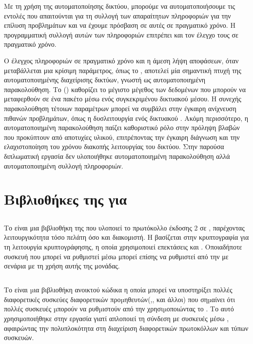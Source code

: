 Με τη χρήση της αυτοματοποίησης δικτύου, μπορούμε να αυτοματοποιήσουμε τις εντολές που απαιτούνται για τη 
συλλογή των απαραίτητων πληροφοριών για την επίλυση προβλημάτων και να έχουμε πρόσβαση σε αυτές σε πραγματικό χρόνο.
Η προγραμματική συλλογή αυτών των πληροφοριών επιτρέπει και τον έλεγχο τους σε πραγματικό χρόνο. 

Ο έλεγχος πληροφοριών σε πραγματικό χρόνο και η άμεση λήψη αποφάσεων, όταν μεταβάλλεται μια κρίσιμη παράμετρος, όπως το , αποτελεί μία σημαντική πτυχή της αυτοματοποιημένης διαχείρισης δικτύων, γνωστή ως αυτοματοποιημένη παρακολούθηση.
Το  () καθορίζει το μέγιστο μέγεθος των δεδομένων που μπορούν να μεταφερθούν σε ένα πακέτο μέσω ενός συγκεκριμένου δικτυακού μέσου. Η συνεχής παρακολούθηση τέτοιων παραμέτρων μπορεί να συμβάλει στην έγκαιρη ανίχνευση πιθανών προβλημάτων, όπως η δυσλειτουργία ενός δικτυακού .
Ακόμη περισσότερο, η αυτοματοποιημένη παρακολούθηση παίζει καθοριστικό ρόλο στην πρόληψη βλαβών που προκύπτουν από αποτυχίες υλικού, επιτρέποντας την έγκαιρη διάγνωση και την ελαχιστοποίηση του χρόνου διακοπής λειτουργίας του δικτύου. Στην παρούσα διπλωματική εργασία δεν υλοποιήθηκε αυτοματοποιημένη παρακολούθηση αλλά αυτοματοποιημένη συλλογή πληροφοριών.


\section{Βιβλιοθήκες της  για }

\subsection{}
Το  είναι μια βιβλιοθήκη της  που υλοποιεί το πρωτόκολλο  έκδοσης 2 σε , παρέχοντας λειτουργικότητα τόσο πελάτη όσο και διακομιστή.
Η  βασίζεται στην κρυπτογραφία για τη λειτουργία κρυπτογράφησης, η οποία χρησιμοποιεί επεκτάσεις  και .
Οποιαδήποτε συσκευή που μπορεί να ρυθμιστεί μέσω  μπορεί επίσης να ρυθμιστεί από την  με σενάρια με τη χρήση αυτής της μονάδας.

\subsection{}
Το  είναι µια βιβλιοθήκη  ανοικτού κώδικα η οποία μπορεί να υποστηρίξει πολλές 
διαφορετικές συσκεύες διαφορετικών προµηθευτών(,, και άλλοι) που σηµαίνει ότι πολλές συσκευές µπορούν 
να ρυθµιστούν από την  χρησιµοποιώντας το . 
Το  αυτό χρησιμοποιήθηκε στην εργασία γιατί απλοποιεί τη σύνδεση με συσκευές μέσω , αφαιρώντας την πολυπλοκότητα στη διαχείριση διαφορετικών πρωτοκόλλων και 
τύπων συσκευών.


